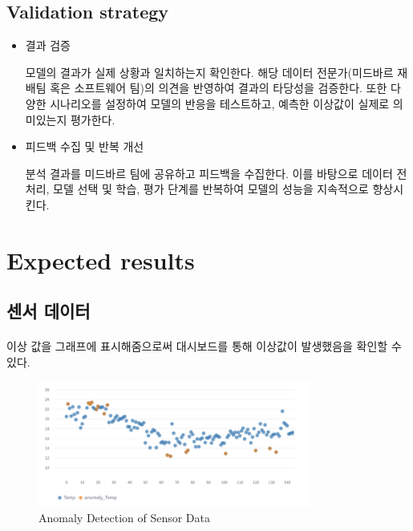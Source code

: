 \documentclass[11pt]{article}
\begin{document}
    \subsection{Validation strategy}
    \begin{itemize}

    \item {결과 검증 } 
    
    모델의 결과가 실제 상황과 일치하는지 확인한다. 해당 데이터 전문가(미드바르 재배팀 혹은 소프트웨어 팀)의 의견을 반영하여 결과의 타당성을 검증한다. 또한 다양한 시나리오를 설정하여 모델의 반응을 테스트하고, 예측한 이상값이 실제로 의미있는지 평가한다.

    \item {피드백 수집 및 반복 개선}  
    
    분석 결과를 미드바르 팀에 공유하고 피드백을 수집한다. 이를 바탕으로 데이터 전처리, 모델 선택 및 학습, 평가 단계를 반복하여 모델의 성능을 지속적으로 향상시킨다.
    \end{itemize}

    \section{Expected results}   
    \subsection{센서 데이터} 

    \paragraph{} 이상 값을 그래프에 표시해줌으로써 대시보드를 통해 이상값이 발생했음을 확인할 수 있다. 
    \begin{figure}[h]
    \centering
    \includegraphics[width=0.8\textwidth]{Latex_Proposal/images/sensor_ex.png} %
    \caption{Anomaly Detection of Sensor Data }
    \label{fig:sensor_ex}
    \end{figure}
\end{document}
